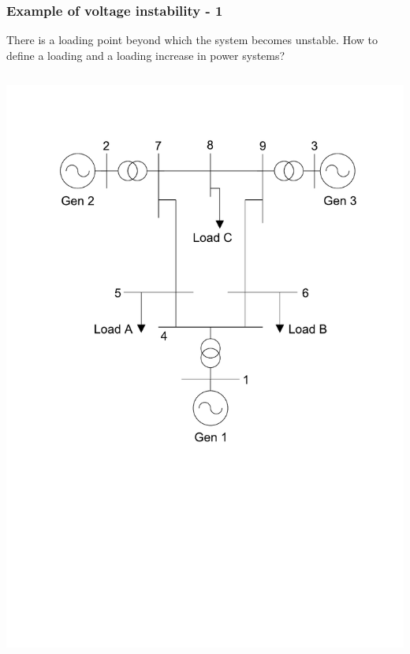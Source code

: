 \documentclass{beamer}
\begin{document}
\begin{frame}[label=example]
\frametitle{Example of voltage instability - 1}
There is a \alert{loading} point beyond which the system becomes unstable.
How to define a \alert{loading} and a \alert{loading increase} in power systems?
\begin{columns}
\includegraphics[width=\textwidth]{Figs/Ieee9bus.pdf}

\end{columns}
\end{frame}
\end{document}
